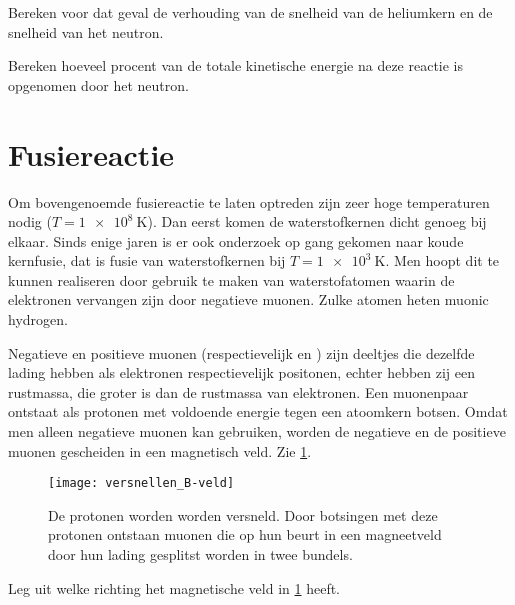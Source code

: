 \begin{questions}
\question
Bereken voor dat geval de verhouding van de snelheid van de heliumkern en 
de snelheid van het neutron.
\begin{solution} 
 
\end{solution} 

\question
Bereken hoeveel procent van de totale kinetische energie na deze reactie is opgenomen door het neutron.
\begin{solution} 

\end{solution}

\section{Fusiereactie}

Om bovengenoemde fusiereactie te laten optreden zijn zeer hoge 
temperaturen nodig ($T = \SI{1e8}{\kelvin}$). Dan eerst komen de waterstofkernen dicht 
genoeg bij elkaar.
Sinds enige jaren is er ook onderzoek op gang gekomen naar koude kernfusie, 
dat is fusie van waterstofkernen bij $T = \SI{1e3}{\kelvin}$. Men hoopt dit te kunnen 
realiseren door gebruik te maken van waterstofatomen waarin de elektronen 
vervangen zijn door negatieve muonen. Zulke atomen heten muonic hydrogen.

Negatieve en positieve muonen (respectievelijk \Pmuon en \APmuon) zijn deeltjes die 
dezelfde lading hebben als elektronen respectievelijk positonen, echter hebben 
zij een rustmassa, die groter is dan de rustmassa van elektronen.
Een muonenpaar ontstaat als protonen met voldoende energie tegen een atoomkern 
botsen. Omdat men alleen negatieve muonen kan gebruiken, worden de negatieve 
en de positieve muonen gescheiden in een magnetisch veld. Zie \ref{fig:versnellen_B-veld}.

\begin{figure}
    \centering
    \texttt{[image: versnellen\_B-veld]}
    \caption{De protonen worden worden versneld. Door botsingen met deze protonen 
    ontstaan muonen die op hun beurt in een magneetveld door hun lading gesplitst 
    worden in twee bundels.}
    \label{fig:versnellen_B-veld}
\end{figure}


\question
 Leg uit welke richting het magnetische veld in \ref{fig:versnellen_B-veld} heeft.
 
\begin{solution} 
\end{solution} 




\end{questions}
